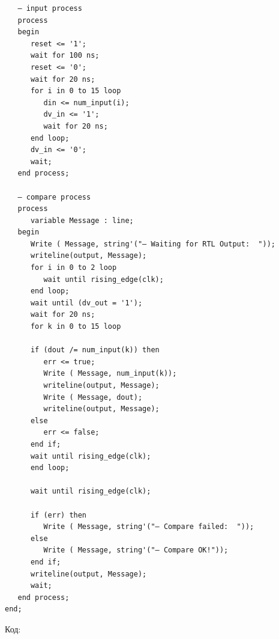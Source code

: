\begin{Code}
\begin{lstlisting}
   — input process
   process
   begin
      reset <= '1';
      wait for 100 ns;
      reset <= '0';
      wait for 20 ns;
      for i in 0 to 15 loop
         din <= num_input(i);
         dv_in <= '1';
         wait for 20 ns;      
      end loop;
      dv_in <= '0';
      wait;
   end process;

   — compare process
   process
      variable Message : line;        
   begin
      Write ( Message, string'("— Waiting for RTL Output:  "));
      writeline(output, Message);   
      for i in 0 to 2 loop
         wait until rising_edge(clk); 
      end loop;  
      wait until (dv_out = '1');  
      wait for 20 ns;
      for k in 0 to 15 loop
            
      if (dout /= num_input(k)) then
         err <= true; 
         Write ( Message, num_input(k));
         writeline(output, Message);
         Write ( Message, dout);
         writeline(output, Message);
      else 
         err <= false;
      end if;
      wait until rising_edge(clk); 
      end loop;

      wait until rising_edge(clk); 

      if (err) then
         Write ( Message, string'("— Compare failed:  "));
      else 
         Write ( Message, string'("— Compare OK!"));
      end if;
      writeline(output, Message);
      wait;
   end process;
end;      
\end{lstlisting}
\end{Code}

Код:

